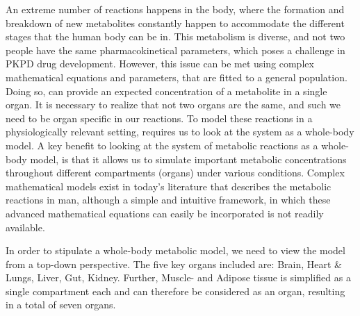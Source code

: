 \documentclass{IEEEtran}
\begin{document}
An extreme number of reactions happens in the body, where the formation and breakdown of new metabolites constantly happen to accommodate the different stages that the human body can be in. This metabolism is diverse, and not two people have the same pharmacokinetical parameters, which poses a challenge in PKPD drug development. However, this issue can be met using complex mathematical equations and parameters, that are fitted to a general population. Doing so, can provide an expected concentration of a metabolite in a single organ. It is necessary to realize that not two organs are the same, and such we need to be organ specific in our reactions. To model these reactions in a physiologically relevant setting, requires us to look at the system as a whole-body model. A key benefit to looking at the system of metabolic reactions as a whole-body model, is that it allows us to simulate important metabolic concentrations throughout different compartments (organs) under various conditions. Complex mathematical models exist in today's literature  that describes the metabolic reactions in man\cite{dash_li_kim_saidel_cabrera_2008,panunzi_pompa_borri_piemonte_gaetano_2020, sorensen_1978, yasemi_jolicoeur_2021}, although a simple and intuitive framework, in which these advanced mathematical equations can easily be incorporated is not readily available.


In order to stipulate a whole-body metabolic model, we need to view the model from a top-down perspective. The five key organs included are: Brain, Heart \& Lungs, Liver, Gut, Kidney. Further, Muscle- and Adipose tissue is simplified as a single compartment each and can therefore be considered as an organ, resulting in a total of seven organs.
\end{document}
